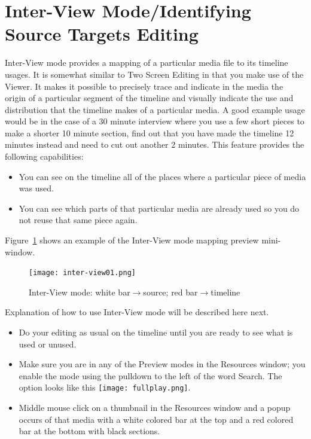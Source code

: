\section{Inter-View Mode\;/\;Identifying Source Targets Editing}%
\label{sec:inter-view_identifying_source_target_editing}

Inter-View mode provides a mapping of a particular media file to its
timeline usages. It is somewhat similar to Two Screen Editing in
that you make use of the Viewer. It makes it possible to precisely
trace and indicate in the media the origin of a particular segment
of the timeline and visually indicate the use and distribution that
the timeline makes of a particular media.  A good example usage
would be in the case of a 30 minute interview where you use a few
short pieces to make a shorter 10 minute section, find out that you
have made the timeline 12 minutes instead and need to cut out
another 2 minutes. This feature provides the following capabilities:

\begin{itemize}
\item You can see on the timeline all of the places where a
  particular piece of media was used.
\item You can see which parts of that particular media are
  already used so you do not reuse that same piece again.
\end{itemize} Figure~\ref{fig:inter-view01} shows an example of the
Inter-View mode mapping preview mini-window.
\begin{figure}[ht]
  \texttt{[image: inter-view01.png]}
  \caption{Inter-View mode: white bar$\rightarrow$source; red
    bar$\rightarrow$timeline}
  \label{fig:inter-view01}
\end{figure}

Explanation of how to use Inter-View mode will be described here
next.

\begin{itemize}
\item Do your editing as usual on the timeline until you are
  ready to see what is used or unused.
\item Make sure you are in any of the Preview modes in the
  Resources window; you enable the mode using the pulldown to the left
  of the word Search.  The option looks like this \quad
  \texttt{[image: fullplay.png]}.
\item Middle mouse click on a thumbnail in the Resources window and
  a popup occurs of that media with a white colored bar at the top
  and a red colored bar at the bottom with black sections.
\end{itemize}

